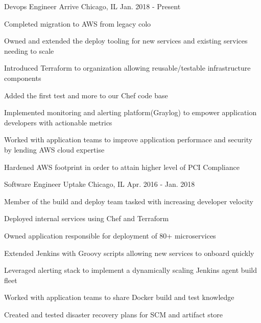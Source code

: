 

\begin{cventries}

  \cventry
    {Devops Engineer} %
    {Arrive} %
    {Chicago, IL} %
    {Jan. 2018 - Present} %
    {
      \begin{cvitems}  %
        \item {Completed migration to AWS from legacy colo}
        \item {Owned and extended the deploy tooling for new services and existing services needing to scale}
        \item {Introduced Terraform to organization allowing reusable/testable infrastructure components}
        \item {Added the first test and more to our Chef code base}
        \item {Implemented monitoring and alerting platform(Graylog) to empower application developers with actionable metrics}
        \item {Worked with application teams to improve application performace and security by lending AWS cloud expertise}
        \item {Hardened AWS footprint in order to attain higher level of PCI Compliance}
      \end{cvitems}
    }

  \cventry
    {Software Engineer} %
    {Uptake} %
    {Chicago, IL} %
    {Apr. 2016 - Jan. 2018} %
    {
      \begin{cvitems} %
        \item {Member of the build and deploy team tasked with increasing developer velocity}
        \item {Deployed internal services using Chef and Terraform}
        \item {Owned application responsible for deployment of 80+ microservices}
        \item {Extended Jenkins with Groovy scripts allowing new services to onboard quickly}
        \item {Leveraged alerting stack to implement a dynamically scaling Jenkins agent build fleet}
        \item {Worked with application teams to share Docker build and test knowledge}
        \item {Created and tested disaster recovery plans for SCM and artifact store}
      \end{cvitems}
    }

\end{cventries}

